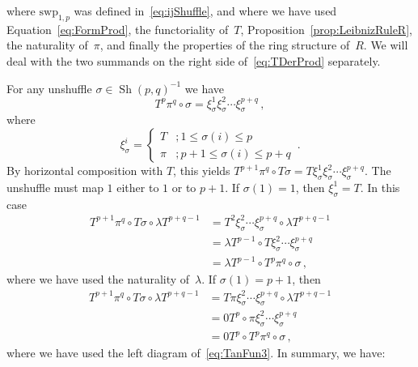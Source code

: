 \documentclass[12pt,reqno, a4paper]{amsart}
\numberwithin{equation}{section}
\theoremstyle{plain}
\theoremstyle{definition}
\theoremstyle{remark}
\DeclareMathOperator{\Shuff}{Sh}
\newcommand{\Swp}{\mathrm{swp}}
\begin{document}
where $\Swp_{1,p}$ was defined in~\eqref{eq:ijShuffle}, and where we have used Equation~\eqref{eq:FormProd}, the functoriality of~$T$, Proposition~\ref{prop:LeibnizRuleR}, the naturality of~$\pi$, and finally the properties of the ring structure of~$R$. We will deal with the two summands on the right side of~\eqref{eq:TDerProd} separately.

For any unshuffle $\sigma \in \Shuff(p,q)^{-1}$ we have
\begin{equation*}
  T^p \pi^q \circ \sigma
  = \xi_\sigma^1 \xi_\sigma^2 \cdots \xi_\sigma^{p+q}
\,,
\end{equation*}
where
\begin{equation*}
  \xi_\sigma^i =
  \begin{cases}
    T &; 1 \leq \sigma(i) \leq p \\
    \pi &;  p+1 \leq \sigma(i) \leq p+q
  \end{cases}
  \,.
\end{equation*}
By horizontal composition with $T$, this yields $T^{p+1}\pi^q \circ T\sigma = T\xi^1_\sigma \xi^2_\sigma \cdots \xi^{p+q}_\sigma$. The unshuffle must map $1$ either to $1$ or to $p+1$. If $\sigma(1) = 1$, then $\xi^1_\sigma = T$. In this case
\begin{equation*}
\begin{split}
  T^{p+1} \pi^q \circ T\sigma \circ \lambda T^{p+q-1}
  &= T^2 \xi^2_\sigma \cdots \xi^{p+q}_\sigma \circ \lambda T^{p+q-1}
  \\
  &= \lambda T^{p-1} \circ T\xi^2_\sigma \cdots \xi^{p+q}_\sigma
  \\
  &= \lambda T^{p-1} \circ T^p \pi^q \circ \sigma
  \,,
\end{split}
\end{equation*}
where we have used the naturality of~$\lambda$. If $\sigma(1) = p+1$, then
\begin{equation*}
\begin{split}
  T^{p+1} \pi^q \circ T\sigma \circ \lambda T^{p+q-1}
  &= T\pi \xi^2_\sigma \cdots \xi^{p+q}_\sigma \circ \lambda T^{p+q-1}
  \\
  &= 0 T^p \circ \pi\xi^2_\sigma \cdots \xi^{p+q}_\sigma
  \\
  &= 0 T^p \circ T^p \pi^q \circ \sigma
  \,,
\end{split}
\end{equation*}
where we have used the left diagram of~\eqref{eq:TanFun3}. In summary, we have:
\end{document}
